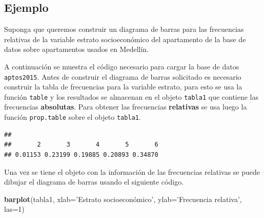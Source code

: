 \documentclass[10pt,]{krantz}
\makeatletter
\newenvironment{Shaded}{\begin{snugshade}}{\end{snugshade}}
\newcommand{\KeywordTok}[1]{\textcolor[rgb]{0.13,0.29,0.53}{\textbf{{#1}}}}
\newcommand{\DataTypeTok}[1]{\textcolor[rgb]{0.13,0.29,0.53}{{#1}}}
\newcommand{\DecValTok}[1]{\textcolor[rgb]{0.00,0.00,0.81}{{#1}}}
\newcommand{\StringTok}[1]{\textcolor[rgb]{0.31,0.60,0.02}{{#1}}}
\newcommand{\NormalTok}[1]{{#1}}
\newenvironment{kframe}{%
\medskip{}
\setlength{\fboxsep}{.8em}
 \def\at@end@of@kframe{}%
 \ifinner\ifhmode%
  \def\at@end@of@kframe{\end{minipage}}%
  \begin{minipage}{\columnwidth}%
 \fi\fi%
 \def\FrameCommand##1{\hskip\@totalleftmargin \hskip-\fboxsep
 \colorbox{shadecolor}{##1}\hskip-\fboxsep
     \hskip-\linewidth \hskip-\@totalleftmargin \hskip\columnwidth}%
 \MakeFramed {\advance\hsize-\width
   \@totalleftmargin\z@ \linewidth\hsize
   \@setminipage}}%
 {\par\unskip\endMakeFramed%
 \at@end@of@kframe}
\renewenvironment{Shaded}{\begin{kframe}}{\end{kframe}}
\makeatother
\begin{document}
\subsection*{Ejemplo}\label{ejemplo-21}


Suponga que queremos construir un diagrama de barras para las
frecuencias relativas de la variable estrato socioeconómico del
apartamento de la base de datos sobre apartamentos usados en Medellín.

A continuación se muestra el código necesario para cargar la base de
datos \texttt{aptos2015}. Antes de construir el diagrama de barras
solicitado es necesario construir la tabla de frecuencias para la
variable estrato, para esto se usa la función \texttt{table} y los
resultados se almacenan en el objeto \texttt{tabla1} que contiene las
frecuencias \textbf{absolutas}. Para obtener las frecuencias
\textbf{relativas} se usa luego la función \texttt{prop.table} sobre el
objeto \texttt{tabla1}.

\begin{Shaded}
\end{Shaded}

\begin{verbatim}
## 
##       2       3       4       5       6 
## 0.01153 0.23199 0.19885 0.20893 0.34870
\end{verbatim}

Una vez se tiene el objeto con la información de las frecuencias
relativas se puede dibujar el diagrama de barras usando el siguiente
código.

\begin{Shaded}
\begin{Highlighting}[]
\KeywordTok{barplot}\NormalTok{(tabla1, }\DataTypeTok{xlab=}\StringTok{'Estrato socioeconómico'}\NormalTok{,}
        \DataTypeTok{ylab=}\StringTok{'Frecuencia relativa'}\NormalTok{, }\DataTypeTok{las=}\DecValTok{1}\NormalTok{)}
\end{Highlighting}
\end{Shaded}
\end{document}
